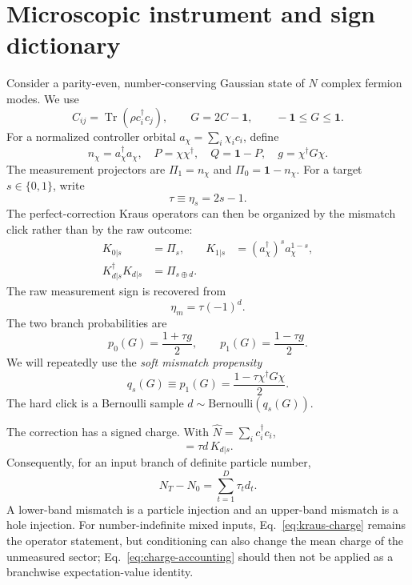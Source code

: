 \documentclass[
  aps,prx,twocolumn,superscriptaddress,longbibliography,
  nofootinbib,floatfix
]{revtex4-2}
\newcommand{\Id}{\mathbf{1}}
\newcommand{\Tr}{\operatorname{Tr}}
\theoremstyle{plain}
\theoremstyle{definition}
\begin{document}
\section{Microscopic instrument and sign dictionary}
\label{sec:instrument}

Consider a parity-even, number-conserving Gaussian state of \(N\) complex
fermion modes.  We use
\begin{equation}
 C_{ij}=\Tr(\rho c_i^\dagger c_j),
 \qquad G=2C-\Id,
 \qquad -\Id\leq G\leq\Id.
 \label{eq:covariance-definition}
\end{equation}
For a normalized controller orbital
\(a_\chi=\sum_i\chi_i c_i\), define
\begin{equation}
 n_\chi=a_\chi^\dagger a_\chi,
 \quad P=\chi\chi^\dagger,
 \quad Q=\Id-P,
 \quad g=\chi^\dagger G\chi.
 \label{eq:local-definitions}
\end{equation}
The measurement projectors are \(\Pi_1=n_\chi\) and
\(\Pi_0=\Id-n_\chi\).  For a target \(s\in\{0,1\}\), write
\begin{equation}
 \tau\equiv\eta_s=2s-1.
 \label{eq:tau-definition}
\end{equation}
The perfect-correction Kraus operators can then be organized by the mismatch
click rather than by the raw outcome:
\begin{align}
 K_{0|s}&=\Pi_s,
 &K_{1|s}&=(a_\chi^\dagger)^s a_\chi^{1-s},
 \label{eq:defect-kraus}\\
 K_{d|s}^\dagger K_{d|s}&=\Pi_{s\oplus d}.
 \nonumber
\end{align}
The raw measurement sign is recovered from
\begin{equation}
 \eta_m=\tau(-1)^d.
 \label{eq:eta-from-defect}
\end{equation}
The two branch probabilities are
\begin{equation}
 p_0(G)=\frac{1+\tau g}{2},
 \qquad
 p_1(G)=\frac{1-\tau g}{2}.
 \label{eq:defect-probabilities}
\end{equation}
We will repeatedly use the \emph{soft mismatch propensity}
\begin{equation}
 q_s(G)\equiv p_1(G)=\frac{1-\tau\chi^\dagger G\chi}{2}.
 \label{eq:soft-defect}
\end{equation}
The hard click is a Bernoulli sample \(d\sim\mathrm{Bernoulli}(q_s(G))\).

The correction has a signed charge.  With \(\hat N=\sum_i c_i^\dagger c_i\),
\begin{equation}
 [\hat N,K_{d|s}]=\tau d\,K_{d|s}.
 \label{eq:kraus-charge}
\end{equation}
Consequently, for an input branch of definite particle number,
\begin{equation}
 N_T-N_0=\sum_{t=1}^{D}\tau_t d_t.
 \label{eq:charge-accounting}
\end{equation}
A lower-band mismatch is a particle injection and an upper-band mismatch is a
hole injection.  For number-indefinite mixed inputs, Eq.~\eqref{eq:kraus-charge}
remains the operator statement, but conditioning can also change the mean
charge of the unmeasured sector; Eq.~\eqref{eq:charge-accounting} should then
not be applied as a branchwise expectation-value identity.
\end{document}
